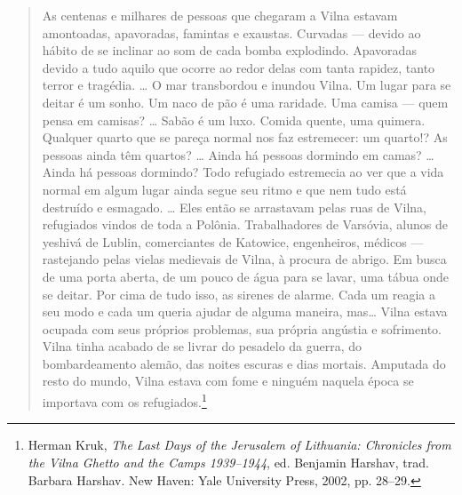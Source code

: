 \begin{quote}
As centenas e milhares de pessoas que chegaram a Vilna estavam
amontoadas, apavoradas, famintas e exaustas. Curvadas --- devido ao hábito
de se inclinar ao som de cada bomba explodindo. Apavoradas devido a tudo
aquilo que ocorre ao redor delas com tanta rapidez, tanto terror e
tragédia. \ldots{} O mar transbordou e inundou Vilna. Um lugar para se
deitar é um sonho. Um naco de pão é uma raridade. Uma camisa --- quem
pensa em camisas? \ldots{} Sabão é um luxo. Comida quente, uma quimera.
Qualquer quarto que se pareça normal nos faz estremecer: um quarto!? As
pessoas ainda têm quartos? \ldots{} Ainda há pessoas dormindo em camas?
\ldots{} Ainda há pessoas dormindo? Todo refugiado estremecia ao ver que
a vida normal em algum lugar ainda segue seu ritmo e que nem tudo está
destruído e esmagado. \ldots{} Eles então se arrastavam pelas ruas de
Vilna, refugiados vindos de toda a Polônia. Trabalhadores de Varsóvia,
alunos de yeshivá de Lublin, comerciantes de Katowice, engenheiros,
médicos --- rastejando pelas vielas medievais de Vilna, à procura de
abrigo. Em busca de uma porta aberta, de um pouco de água para se lavar,
uma tábua onde se deitar. Por cima de tudo isso, as sirenes de alarme.
Cada um reagia a seu modo e cada um queria ajudar de alguma maneira,
mas\ldots{} Vilna estava ocupada com seus próprios problemas, sua
própria angústia e sofrimento. Vilna tinha acabado de se livrar do
pesadelo da guerra, do bombardeamento alemão, das noites escuras e dias
mortais. Amputada do resto do mundo, Vilna estava com fome e ninguém
naquela época se importava com os refugiados.\footnote{Herman Kruk,
  \emph{The Last Days of the Jerusalem of Lithuania: Chronicles from the
  Vilna Ghetto and the Camps 1939--1944}, ed. Benjamin Harshav, trad.
  Barbara Harshav. New Haven: Yale University Press, 2002, pp. 28--29.}
\end{quote}

